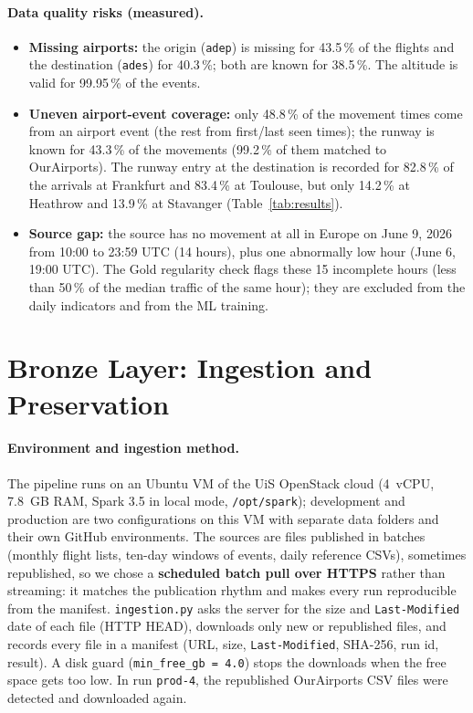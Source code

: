 \documentclass[11pt,a4paper]{article}
\begin{document}
\paragraph{Data quality risks (measured).}
\begin{itemize}[noitemsep,topsep=2pt]
    \item \textbf{Missing airports:} the origin (\texttt{adep}) is missing for 43.5\,\% of the flights and the destination (\texttt{ades}) for 40.3\,\%; both are known for 38.5\,\%. The altitude is valid for 99.95\,\% of the events.
    \item \textbf{Uneven airport-event coverage:} only 48.8\,\% of the movement times come from an airport event (the rest from first/last seen times); the runway is known for 43.3\,\% of the movements (99.2\,\% of them matched to OurAirports). The runway entry at the destination is recorded for 82.8\,\% of the arrivals at Frankfurt and 83.4\,\% at Toulouse, but only 14.2\,\% at Heathrow and 13.9\,\% at Stavanger (Table~\ref{tab:results}).
    \item \textbf{Source gap:} the source has no movement at all in Europe on June 9, 2026 from 10:00 to 23:59 UTC (14 hours), plus one abnormally low hour (June 6, 19:00 UTC). The Gold regularity check flags these 15 incomplete hours (less than 50\,\% of the median traffic of the same hour); they are excluded from the daily indicators and from the ML training.
\end{itemize}

\section{Bronze Layer: Ingestion and Preservation}

\paragraph{Environment and ingestion method.}
The pipeline runs on an Ubuntu VM of the UiS OpenStack cloud (4~vCPU, 7.8~GB RAM, Spark 3.5 in local mode, \texttt{/opt/spark}); development and production are two configurations on this VM with separate data folders and their own GitHub environments. The sources are files published in batches (monthly flight lists, ten-day windows of events, daily reference CSVs), sometimes republished, so we chose a \textbf{scheduled batch pull over HTTPS} rather than streaming: it matches the publication rhythm and makes every run reproducible from the manifest.
\texttt{ingestion.py} asks the server for the size and \texttt{Last-Modified} date of each file (HTTP HEAD), downloads only new or republished files, and records every file in a manifest (URL, size, \texttt{Last-Modified}, SHA-256, run id, result). A disk guard (\texttt{min\_free\_gb = 4.0}) stops the downloads when the free space gets too low. In run \texttt{prod-4}, the republished OurAirports CSV files were detected and downloaded again.
\end{document}

